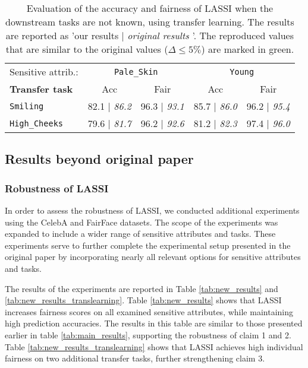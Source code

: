 
\begin{table}[H]
\centering
\begin{tabular}{lcccc}
\toprule
\multicolumn{1}{c}{Sensitive attrib.:} & \multicolumn{2}{c}{\texttt{Pale\_Skin}} & \multicolumn{2}{c}{\texttt{Young}} \\
\cmidrule(rl){2-3} \cmidrule(rl){4-5}
\textbf{Transfer task} & Acc & Fair & Acc & Fair \\
\cmidrule(rl){1-1} \cmidrule(rl){2-3} \cmidrule(rl){4-5}
\texttt{Smiling} & \colorbox{mygreen}{82.1} | \textit{86.2} & \colorbox{mygreen}{96.3} | \textit{93.1} & \colorbox{mygreen}{85.7} | \textit{86.0} & \colorbox{mygreen}{96.2} | \textit{95.4} \\
\texttt{High\_Cheeks} & \colorbox{mygreen}{79.6} | \textit{81.7} & \colorbox{mygreen}{96.2} | \textit{92.6} & \colorbox{mygreen}{81.2} | \textit{82.3} & \colorbox{mygreen}{97.4} | \textit{96.0}  \\
\bottomrule
\end{tabular}
\caption{\label{tab:transf_repr} Evaluation of the accuracy and fairness of LASSI when the downstream tasks are not known, using transfer learning. The results are reported as 'our results | \textit{original results \cite{peychev2022latent}}'. The reproduced values that are similar to the original values ($\Delta \leq 5\%$) are marked in green.}
\end{table}

\subsection{Results beyond original paper}\label{sec:own_contrib}

\subsubsection{Robustness of LASSI}\label{subsec:robustness} 

In order to assess the robustness of LASSI, we conducted additional experiments using the CelebA and FairFace datasets. The scope of the experiments was expanded to include a wider range of sensitive attributes and tasks. These experiments serve to further complete the experimental setup presented in the original paper by incorporating nearly all relevant options for sensitive attributes and tasks. \newline 

The results of the experiments are reported in Table \ref{tab:new_results} and \ref{tab:new_results_translearning}. Table \ref{tab:new_results} shows that LASSI increases fairness scores on all examined sensitive attributes, while maintaining high prediction accuracies. The results in this table are similar to those presented earlier in table \ref{tab:main_results}, supporting the robustness of claim 1 and 2. Table \ref{tab:new_results_translearning} shows that LASSI achieves high individual fairness on two additional transfer tasks, further strengthening claim 3. \newline

